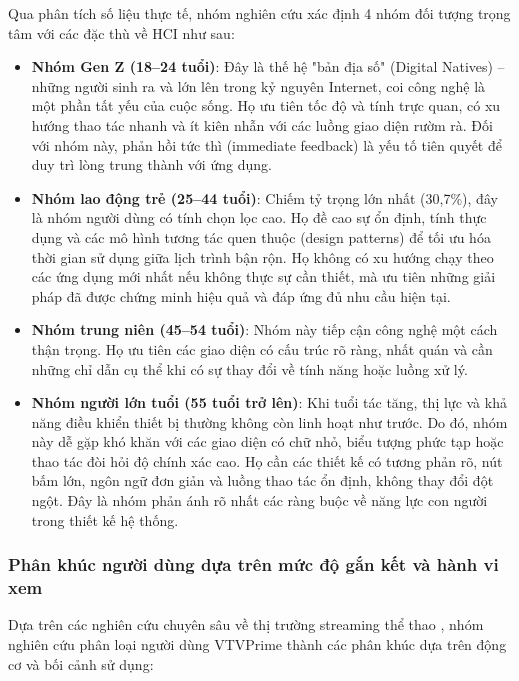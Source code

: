 \medskip\noindent Qua phân tích số liệu thực tế, nhóm nghiên cứu xác định 4 nhóm đối tượng trọng tâm với các đặc thù về HCI như sau:

\begin{itemize}
    \item \textbf{Nhóm Gen Z (18--24 tuổi)}: Đây là thế hệ "bản địa số" (Digital Natives) – những người sinh ra và lớn lên trong kỷ nguyên Internet, coi công nghệ là một phần tất yếu của cuộc sống. Họ ưu tiên tốc độ và tính trực quan, có xu hướng thao tác nhanh và ít kiên nhẫn với các luồng giao diện rườm rà. Đối với nhóm này, phản hồi tức thì (immediate feedback) là yếu tố tiên quyết để duy trì lòng trung thành với ứng dụng.
    
    \item \textbf{Nhóm lao động trẻ (25--44 tuổi)}: Chiếm tỷ trọng lớn nhất (30,7\%), đây là nhóm người dùng có tính chọn lọc cao. Họ đề cao sự ổn định, tính thực dụng và các mô hình tương tác quen thuộc (design patterns) để tối ưu hóa thời gian sử dụng giữa lịch trình bận rộn. Họ không có xu hướng chạy theo các ứng dụng mới nhất nếu không thực sự cần thiết, mà ưu tiên những giải pháp đã được chứng minh hiệu quả và đáp ứng đủ nhu cầu hiện tại.
    
    \item \textbf{Nhóm trung niên (45--54 tuổi)}: Nhóm này tiếp cận công nghệ một cách thận trọng. Họ ưu tiên các giao diện có cấu trúc rõ ràng, nhất quán và cần những chỉ dẫn cụ thể khi có sự thay đổi về tính năng hoặc luồng xử lý.
    
    \item \textbf{Nhóm người lớn tuổi (55 tuổi trở lên)}: Khi tuổi tác tăng, thị lực và khả năng điều khiển thiết bị thường không còn linh hoạt như trước. Do đó, nhóm này dễ gặp khó khăn với các giao diện có chữ nhỏ, biểu tượng phức tạp hoặc thao tác đòi hỏi độ chính xác cao. Họ cần các thiết kế có tương phản rõ, nút bấm lớn, ngôn ngữ đơn giản và luồng thao tác ổn định, không thay đổi đột ngột. Đây là nhóm phản ánh rõ nhất các ràng buộc về năng lực con người trong thiết kế hệ thống.
\end{itemize}

\subsubsection{Phân khúc người dùng dựa trên mức độ gắn kết và hành vi xem}

Dựa trên các nghiên cứu chuyên sâu về thị trường streaming thể thao \cite{kantar2026,disneyadvertising2025,parksassociates2025}, nhóm nghiên cứu phân loại người dùng VTVPrime thành các phân khúc dựa trên động cơ và bối cảnh sử dụng:

